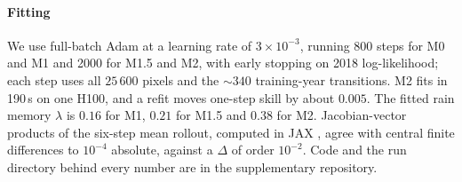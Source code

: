 \documentclass[letterpaper]{article} %
\begin{document}
\paragraph{Fitting} We use full-batch Adam \citep{kingma2015} at a learning rate of $3\times10^{-3}$, running 800 steps for M0 and M1 and 2000 for M1.5 and M2, with early stopping on 2018 log-likelihood; each step uses all $25\,600$ pixels and the $\sim340$ training-year transitions. M2 fits in 190\,s on one H100, and a refit moves one-step skill by about $0.005$. The fitted rain memory $\lambda$ is $0.16$ for M1, $0.21$ for M1.5 and $0.38$ for M2. Jacobian-vector products of the six-step mean rollout, computed in JAX \citep{jax2018}, agree with central finite differences to $10^{-4}$ absolute, against a $\Delta$ of order $10^{-2}$. Code and the run directory behind every number are in the supplementary repository.

\end{document}
